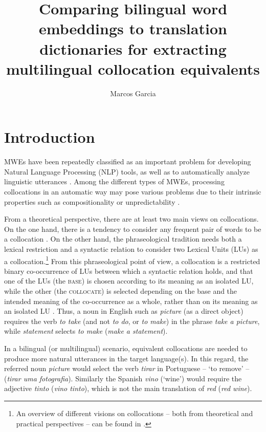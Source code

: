 \documentclass[output=paper
,modfonts
,nonflat]{langsci/langscibook}
\title{Comparing bilingual word embeddings to translation dictionaries for extracting multilingual collocation equivalents}
\author{%
 Marcos Garcia\affiliation{Universidade da Coruña}
}
\begin{document}
\maketitle
\label{GARCIA-CHAPTER}

\section{Introduction}
MWEs have been repeatedly classified as an important problem for developing
Natural Language Processing (NLP) tools, as well as to automatically analyze linguistic
utterances \citep{Sag2002a}. Among the different types of MWEs, processing
collocations in an automatic way may pose various problems due to their intrinsic properties
such as compositionality or unpredictability \citep{melcuk98}.

From a theoretical perspective, there are at least two main views on collocations.
On the one hand, there is a tendency to consider any frequent pair of words to be
a collocation \citep{smadja1993,evert2003,kilgarriff2006}.
On the other hand, the phraseological tradition needs both a lexical restriction and a syntactic
relation to consider two Lexical Units (LUs) as a collocation.\footnote{An overview of different visions on collocations
  -- both from theoretical and practical perspectives -- can be found in \citet{seretan2011syntax}.}
From this phraseological point of view, a collocation is a restricted binary co-occurrence of LUs
between which a syntactic relation holds, and that one of the LUs (the \textsc{base})
is chosen according to its meaning as an isolated LU, while the other (the \textsc{collocate})
is selected depending on the base and the intended meaning of the co-occurrence as a whole,
rather than on its meaning as an isolated LU \citep{melcuk98}. Thus, a noun in English
such as \textit{picture} (as a direct object) requires the verb \textit{to take} (and not \textit{to do}, or \textit{to make})
in the phrase \textit{take a picture}, while \textit{statement} selects \textit{to make} (\textit{make a statement}).

In a bilingual (or multilingual) scenario, equivalent collocations are needed
to produce more natural utterances in the target language(s). In this regard,
the referred noun \textit{picture} would select the verb \textit{tirar} in Portuguese
-- `to remove' -- (\textit{tirar uma fotografia}). Similarly the Spanish \textit{vino}
(`wine') would require the adjective \textit{tinto} (\textit{vino tinto}), which is not
the main translation of \textit{red} (\textit{red wine}).
\end{document}
